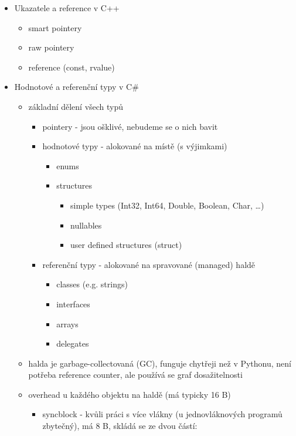 \begin{itemize}
\begin{itemize}
\begin{itemize}
\item nint a nuint mají nativní velikost (64 nebo 32 bitů, podle platformy)
\end{itemize}
\end{itemize}
\item Ukazatele a reference v C++
\begin{itemize}
\item smart pointery
\item raw pointery
\item reference (const, rvalue)
\end{itemize}
\item Hodnotové a referenční typy v C\#
\begin{itemize}
\item základní dělení všech typů
\begin{itemize}
\item pointery - jsou ošklivé, nebudeme se o nich bavit
\item hodnotové typy - alokované na místě (s výjimkami)
\begin{itemize}
\item enums
\item structures
\begin{itemize}
\item simple types (Int32, Int64, Double, Boolean, Char, \dots{})
\item nullables
\item user defined structures (struct)
\end{itemize}
\end{itemize}
\item referenční typy - alokované na spravované (managed) haldě
\begin{itemize}
\item classes (e.g. strings)
\item interfaces
\item arrays
\item delegates
\end{itemize}
\end{itemize}
\item halda je garbage-collectovaná (GC), funguje chytřeji než v Pythonu, není potřeba reference counter, ale používá se graf dosažitelnosti
\item overhead u každého objektu na haldě (má typicky 16 B)
\begin{itemize}
\item syncblock - kvůli práci s více vlákny (u jednovláknových programů zbytečný), má 8 B, skládá se ze dvou částí:

\end{itemize}
\end{itemize}
\end{itemize}
